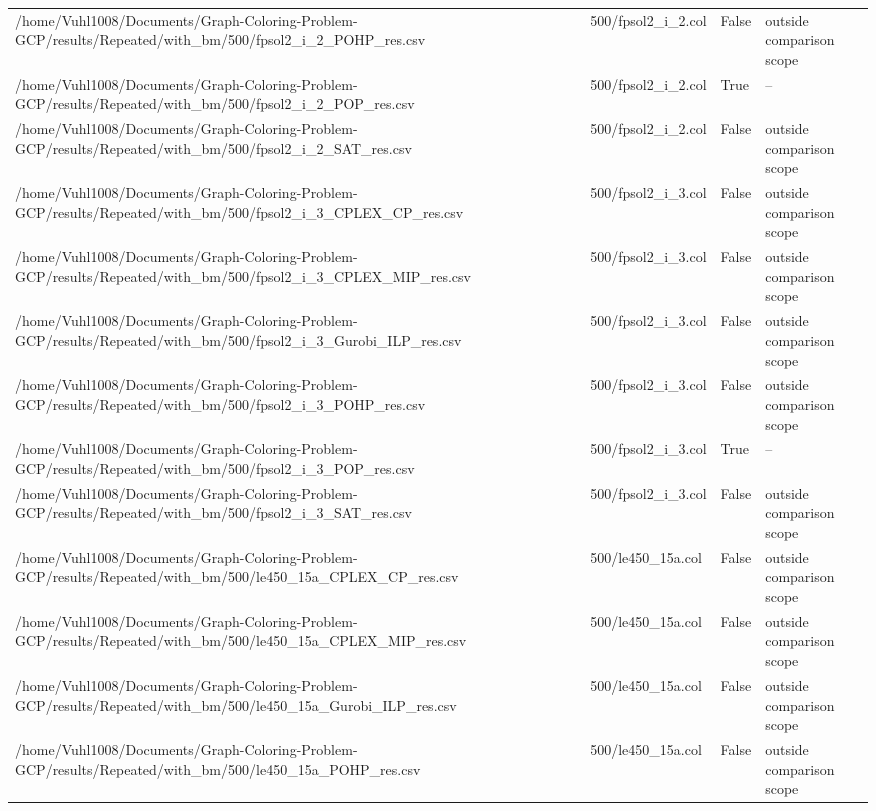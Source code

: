 \begin{table}[htbp]
\begin{tabular}{llll}
/home/Vuhl1008/Documents/Graph-Coloring-Problem-GCP/results/Repeated/with\_bm/500/fpsol2\_i\_2\_POHP\_res.csv & 500/fpsol2\_i\_2.col & False & outside comparison scope \\
/home/Vuhl1008/Documents/Graph-Coloring-Problem-GCP/results/Repeated/with\_bm/500/fpsol2\_i\_2\_POP\_res.csv & 500/fpsol2\_i\_2.col & True & -- \\
/home/Vuhl1008/Documents/Graph-Coloring-Problem-GCP/results/Repeated/with\_bm/500/fpsol2\_i\_2\_SAT\_res.csv & 500/fpsol2\_i\_2.col & False & outside comparison scope \\
/home/Vuhl1008/Documents/Graph-Coloring-Problem-GCP/results/Repeated/with\_bm/500/fpsol2\_i\_3\_CPLEX\_CP\_res.csv & 500/fpsol2\_i\_3.col & False & outside comparison scope \\
/home/Vuhl1008/Documents/Graph-Coloring-Problem-GCP/results/Repeated/with\_bm/500/fpsol2\_i\_3\_CPLEX\_MIP\_res.csv & 500/fpsol2\_i\_3.col & False & outside comparison scope \\
/home/Vuhl1008/Documents/Graph-Coloring-Problem-GCP/results/Repeated/with\_bm/500/fpsol2\_i\_3\_Gurobi\_ILP\_res.csv & 500/fpsol2\_i\_3.col & False & outside comparison scope \\
/home/Vuhl1008/Documents/Graph-Coloring-Problem-GCP/results/Repeated/with\_bm/500/fpsol2\_i\_3\_POHP\_res.csv & 500/fpsol2\_i\_3.col & False & outside comparison scope \\
/home/Vuhl1008/Documents/Graph-Coloring-Problem-GCP/results/Repeated/with\_bm/500/fpsol2\_i\_3\_POP\_res.csv & 500/fpsol2\_i\_3.col & True & -- \\
/home/Vuhl1008/Documents/Graph-Coloring-Problem-GCP/results/Repeated/with\_bm/500/fpsol2\_i\_3\_SAT\_res.csv & 500/fpsol2\_i\_3.col & False & outside comparison scope \\
/home/Vuhl1008/Documents/Graph-Coloring-Problem-GCP/results/Repeated/with\_bm/500/le450\_15a\_CPLEX\_CP\_res.csv & 500/le450\_15a.col & False & outside comparison scope \\
/home/Vuhl1008/Documents/Graph-Coloring-Problem-GCP/results/Repeated/with\_bm/500/le450\_15a\_CPLEX\_MIP\_res.csv & 500/le450\_15a.col & False & outside comparison scope \\
/home/Vuhl1008/Documents/Graph-Coloring-Problem-GCP/results/Repeated/with\_bm/500/le450\_15a\_Gurobi\_ILP\_res.csv & 500/le450\_15a.col & False & outside comparison scope \\
/home/Vuhl1008/Documents/Graph-Coloring-Problem-GCP/results/Repeated/with\_bm/500/le450\_15a\_POHP\_res.csv & 500/le450\_15a.col & False & outside comparison scope \\

\end{tabular}
\end{table}
